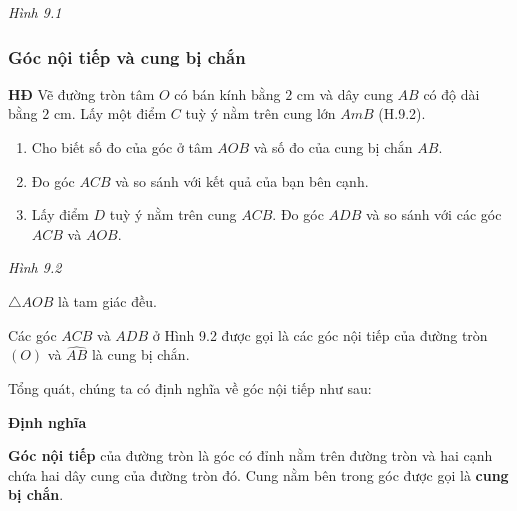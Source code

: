 \begin{lesson}
\begin{center}
    \textit{Hình 9.1}
    \end{center}

    \subsubsection{Góc nội tiếp và cung bị chắn}

    \textbf{HĐ} Vẽ đường tròn tâm $O$ có bán kính bằng $2$ cm và dây cung $AB$ có độ dài bằng $2$ cm. Lấy một điểm $C$ tuỳ ý nằm trên cung lớn $AmB$ (H.9.2).
    \begin{enumerate}[label=\alph*)]
        \item Cho biết số đo của góc ở tâm $AOB$ và số đo của cung bị chắn $AB$.

        \answerline
        \item Đo góc $ACB$ và so sánh với kết quả của bạn bên cạnh.

        \answerline
        \item Lấy điểm $D$ tuỳ ý nằm trên cung $ACB$. Đo góc $ADB$ và so sánh với các góc $ACB$ và $AOB$.

        \answerline
    \end{enumerate}

    \begin{center}

    \textit{Hình 9.2}
    \end{center}

    $\triangle AOB$ là tam giác đều.

    Các góc $ACB$ và $ADB$ ở Hình 9.2 được gọi là các góc nội tiếp của đường tròn $(O)$ và $\widehat{AB}$ là cung bị chắn.

    Tổng quát, chúng ta có định nghĩa về góc nội tiếp như sau:

    \textbf{Định nghĩa}

    \begin{keyconcept}
        \textbf{Góc nội tiếp} của đường tròn là góc có đỉnh nằm trên đường tròn và hai cạnh chứa hai dây cung của đường tròn đó. Cung nằm bên trong góc được gọi là \textbf{cung bị chắn}.
    \end{keyconcept}


\end{lesson}
